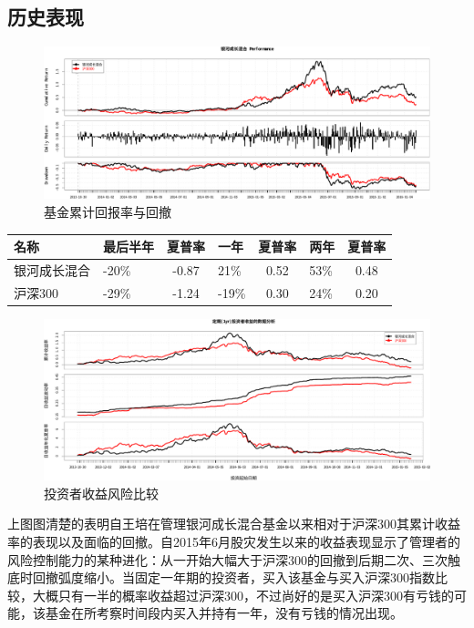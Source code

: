 \documentclass[hyperref,]{ctexart}
\begin{document}
\subsection{历史表现}

\begin{figure}[htbp]
\centering
\includegraphics{wangpei-details_files/figure-latex/unnamed-chunk-5-1.pdf}
\caption{基金累计回报率与回撤}
\end{figure}

\begin{longtable}[]{@{}llclclc@{}}
\toprule
名称 & 最后半年 & 夏普率 & 一年 & 夏普率 & 两年 & 夏普率\tabularnewline
\midrule
\endhead
银河成长混合 & -20\% & -0.87 & 21\% & 0.52 & 53\% & 0.48\tabularnewline
沪深300 & -29\% & -1.24 & -19\% & 0.30 & 24\% & 0.20\tabularnewline
\bottomrule
\end{longtable}

\begin{figure}[htbp]
\centering
\includegraphics{wangpei-details_files/figure-latex/unnamed-chunk-6-1.pdf}
\caption{投资者收益风险比较}
\end{figure}

上图图清楚的表明自王培在管理银河成长混合基金以来相对于沪深300其累计收益率的表现以及面临的回撤。自2015年6月股灾发生以来的收益表现显示了管理者的风险控制能力的某种进化：从一开始大幅大于沪深300的回撤到后期二次、三次触底时回撤弧度缩小。当固定一年期的投资者，买入该基金与买入沪深300指数比较，大概只有一半的概率收益超过沪深300，不过尚好的是买入沪深300有亏钱的可能，该基金在所考察时间段内买入并持有一年，没有亏钱的情况出现。
\end{document}
